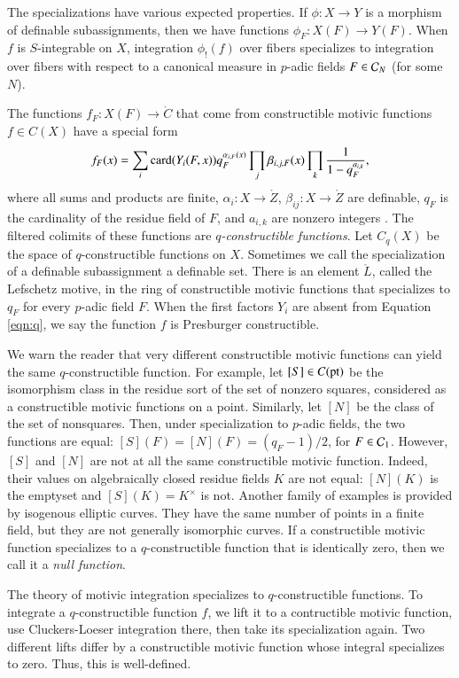 The specializations have various expected properties.
If $\phi:X\to Y$ is a morphism of definable subassignments, then we have functions $\phi_F:X(F)\to Y(F)$.
When $f$ is $S$-integrable on $X$,  integration $\phi_!(f)$ over fibers  specializes to integration over fibers 
with respect to a canonical measure in
 $p$-adic fields $F\in \mathcal C_N$ (for some $N$).


The functions $f_F:X(F)\to\ring{C}$ that come from constructible motivic functions  $f\in C(X)$ have a special form
\begin{equation}\label{eqn:q}
f_F(x) = \sum_i {\operatorname{card}}(Y_i(F,x)) q_F^{\alpha_{i,F}(x)} \prod_j \beta_{i,j,F}(x)\prod_k \frac{1}{1-q_F^{a_{i,k}}},
\end{equation}
where all sums and products are finite, $\alpha_{i}:X\to\ring{Z}$, $\beta_{ij}:X\to\ring{Z}$ are definable, $q_F$
is the  cardinality of the residue field of $F$, and $a_{i,k}$ are nonzero integers \cite[\S2]{cluckers2011btransfer}.
The filtered colimits of these functions are  {\it $q$-constructible functions}.  Let $C_q(X)$ be the space of
$q$-constructible functions on $X$.
Sometimes we call the specialization of a  definable subassignment a definable set.  
There is an element $\ring{L}$, called the Lefschetz motive, in the ring of constructible motivic functions that specializes to $q_F$
for every $p$-adic field $F$.  When the first factors $Y_i$ are absent from Equation \ref{eqn:q}, we say the function $f$
is Presburger constructible.

We warn the reader that
very different constructible motivic functions can yield the same $q$-constructible function.  For example,
let $[S]\in C({\operatorname{pt}})$ be the isomorphism class in the residue sort of the set of nonzero squares, considered as a 
constructible motivic functions on a point.  Similarly, let $[N]$ be the class of the set of nonsquares.  Then, under specialization
to $p$-adic fields, the
two functions are equal:
$[S](F) = [N](F) = (q_F-1)/2$, for $F\in\mathcal C_1$. However, $[S]$ and $[N]$ are not at all the same constructible motivic function. Indeed,  their values on 
algebraically closed residue fields $K$ are not equal: $[N](K)$ is the emptyset and $[S](K) = K^\times$ is not.
Another family of examples is provided by isogenous elliptic curves.  They have the same number of points in a finite field, but
they are not generally isomorphic curves.
If a constructible motivic function specializes to a $q$-constructible function that is identically zero, then we call
it a {\it null function}.

The theory of motivic integration specializes to $q$-constructible functions. To integrate a $q$-constructible function $f$, we lift it to 
a contructible motivic function, use Cluckers-Loeser integration there, then take its specialization again.
Two different lifts differ by a constructible motivic function whose integral specializes to zero. Thus, this
is well-defined.


